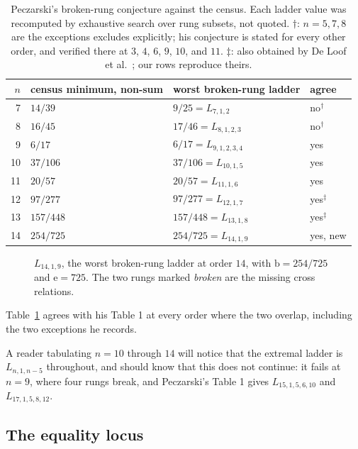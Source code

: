 \documentclass[11pt]{article}
\theoremstyle{definition}
\newcommand{\ext}{\mathrm{e}}
\newcommand{\bal}{\mathrm{b}}
\begin{document}
\begin{table}[ht]
\centering
\begin{tabular}{rlll}
\toprule
$n$ & census minimum, non-sum & worst broken-rung ladder & agree\\
\midrule
 7 & $14/39$   & $9/25 = L_{7,1,2}$      & no$^\dagger$\\
 8 & $16/45$   & $17/46 = L_{8,1,2,3}$   & no$^\dagger$\\
 9 & $6/17$    & $6/17 = L_{9,1,2,3,4}$  & yes\\
10 & $37/106$  & $37/106 = L_{10,1,5}$   & yes\\
11 & $20/57$   & $20/57 = L_{11,1,6}$    & yes\\
12 & $97/277$  & $97/277 = L_{12,1,7}$   & yes$^\ddagger$\\
13 & $157/448$ & $157/448 = L_{13,1,8}$  & yes$^\ddagger$\\
14 & $254/725$ & $254/725 = L_{14,1,9}$  & yes, new\\
\bottomrule
\end{tabular}
\caption{Peczarski's broken-rung conjecture against the census.  Each ladder
value was recomputed by exhaustive search over rung subsets, not quoted.
$\dagger$: $n=5,7,8$ are the exceptions \cite{peczarski-ladders} excludes
explicitly; his conjecture is stated for every other order, and verified there
at $3$, $4$, $6$, $9$, $10$, and $11$.  $\ddagger$: also obtained by De Loof
et al.\ \cite[\S4.2.2]{deloof-census}; our rows reproduce theirs.}
\label{tab:ladder}
\end{table}

\begin{figure}[ht]
\centering

\caption{$L_{14,1,9}$, the worst broken-rung ladder at order $14$, with
$\bal=254/725$ and $\ext=725$.  The two rungs marked \emph{broken} are the
missing cross relations.}
\label{fig:ladder}
\end{figure}

Table~\ref{tab:ladder} agrees with his Table 1 at every order where the two
overlap, including the two exceptions he records.

A reader tabulating $n=10$ through $14$ will notice that the extremal ladder
is $L_{n,1,n-5}$ throughout, and should know that this does not continue: it
fails at $n=9$, where four rungs break, and Peczarski's Table 1 gives
$L_{15,1,5,6,10}$ and $L_{17,1,5,8,12}$.

\subsection{The equality locus}
\end{document}
